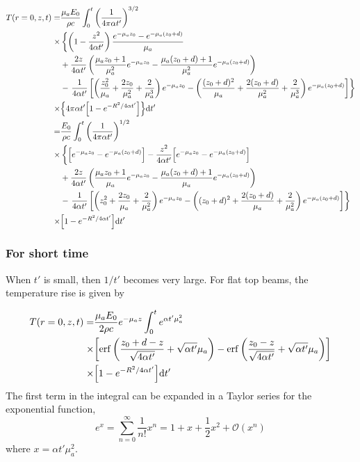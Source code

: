 \documentclass[]{article}
\begin{document}
\begin{align}
  \label{eq:flattop_temp_approx}
  T(r=0, z,t) =& \frac{\mu_a E_0}{\rho c} \int_0^t \qty(\frac{1}{4\pi \alpha t'})^{3/2}  \nonumber \\
  \times & \left\{\left(1 -  \frac{z^2}{4\alpha t'}\right)\frac{e^{-\mu_a z_0} - e^{-\mu_a (z_0+d)}}{\mu_a} \right.\nonumber \\
    &+ \frac{2z}{4\alpha t'} \left( \frac{\mu_a z_0 + 1}{\mu_a^2}e^{-\mu_a z_0} - \frac{\mu_a (z_0+d) + 1}{\mu_a^2}e^{-\mu_a (z_0+d)}\right) \nonumber \\
    &- \left.\frac{1}{4\alpha t'}\left[
   \left( \frac{z_0^2}{\mu_a} + \frac{2z_0}{\mu_a^2} + \frac{2}{\mu_a^3} \right)e^{-\mu_a z_0} -
   \left( \frac{(z_0 + d)^2}{\mu_a} + \frac{2(z_0 + d)}{\mu_a^2} + \frac{2}{\mu_a^3} \right)e^{-\mu_a (z_0+d)}
 \right]
\right\} \nonumber \\
  \times & \qty{4\pi \alpha t' \qty[1 - e^{-R^2/4\alpha t'}] }
  \dd t' \\
  =&
  \frac{E_0}{\rho c} \int_0^t \qty(\frac{1}{4\pi \alpha t'})^{1/2}  \nonumber \nonumber \\
  \times & \left\{\qty[e^{-\mu_a z_0} - e^{-\mu_a (z_0+d)}]   -  \frac{z^2}{4\alpha t'}\qty[e^{-\mu_a z_0} - e^{-\mu_a (z_0+d)}]\right. \nonumber \\
    &+ \frac{2z}{4\alpha t'} \left( \frac{\mu_a z_0 + 1}{\mu_a}e^{-\mu_a z_0} - \frac{\mu_a (z_0+d) + 1}{\mu_a}e^{-\mu_a (z_0+d)}\right) \nonumber \\
    &- \left.\frac{1}{4\alpha t'}\left[
   \left( z_0^2       + \frac{2z_0}{\mu_a} + \frac{2}{\mu_a^2} \right)e^{-\mu_a z_0} -
   \left( (z_0 + d)^2 + \frac{2(z_0 + d)}{\mu_a} + \frac{2}{\mu_a^2} \right)e^{-\mu_a (z_0+d)}
 \right]
\right\} \nonumber \\
  \times & \qty[1 - e^{-R^2/4\alpha t'}]
  \dd t'
\end{align}

\subsubsection{For short time}


When $t'$ is small, then $1/t'$ becomes very large. For flat top beams, the temperature rise is given by

\begin{align*}
	T(r=0, z,t) =& \frac{\mu_aE_0}{2\rho c}e^{-\mu_a z} \int_0^t e^{\alpha t'\mu_a^2}  \nonumber \\
	\times & \qty[\erf\qty(\frac{z_0 + d - z}{\sqrt{4\alpha t'}} + \sqrt{\alpha t'}\mu_a ) - \erf\qty(\frac{z_0 - z}{\sqrt{4\alpha t'}} + \sqrt{\alpha t'}\mu_a ) ]  \\
	\times & \qty[1 - e^{-R^2/4\alpha t'} ]
	\dd t'
\end{align*}
The first term in the integral can be expanded in a Taylor series for the exponential function,
\begin{equation}
	e^x = \sum_{n=0}^{\infty} \frac{1}{n!} x^n = 1 + x + \frac{1}{2} x^2 + \mathcal{O}(x^n)
\end{equation}
where $x = \alpha t' \mu_a^2$.
\end{document}
